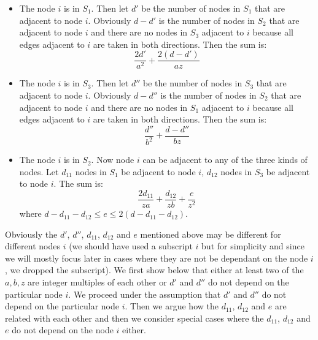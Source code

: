 \begin{itemize}
\item The node $i$ is in $S_1$. Then let $d'$ be the number of nodes in $S_1$ that are adjacent to node $i$. Obviously $d-d'$ is the number of nodes in $S_2$ that are adjacent to node $i$ and there are no nodes in $S_3$ adjacent to $i$ because all edges adjacent to $i$ are taken in both directions. Then the sum is: $$\frac{2d'}{a^2}+\frac{2 (d-d')}{az}$$

\item The node $i$ is in $S_3$. Then let $d''$ be the number of nodes in $S_3$ that are adjacent to node $i$. Obviously $d-d''$ is the number of nodes in $S_2$ that are adjacent to node $i$ and there are no nodes in $S_1$ adjacent to $i$ because all edges adjacent to $i$ are taken in both directions. Then the sum is: $$\frac{d''}{b^2}+ \frac{d-d''}{bz} $$


\item The node $i$ is in $S_2$. Now node $i$ can be adjacent to any of the three kinds of nodes. Let  $d_{11}$ nodes in $S_1$ be adjacent to node $i$, $d_{12}$ nodes in $S_3$ be adjacent to node $i$. The sum is:
    $$\frac{2d_{11}}{za}+ \frac{d_{12}}{zb}+ \frac{e}{z^2}$$
    where $d-d_{11}-d_{12}\leq e \leq 2(d-d_{11}-d_{12})$.
\end{itemize}

Obviously the $d'$, $d''$, $d_{11}$, $d_{12}$ and $e$ mentioned above may be
different for different nodes $i$ (we should have used a subscript $i$ but
for simplicity and since we will mostly focus later in cases
where they are not be dependant on the node
$i$, we dropped the subscript). We first show below that either at least two of
the $a,b,z$ are integer
multiples of each other or $d'$ and $d''$ do not
depend on the particular node $i$.
We proceed under the assumption that  $d'$ and $d''$ do not
depend on the particular node $i$.
Then we argue how the $d_{11}$, $d_{12}$ and $e$
are related with each other and then we consider special cases where
the $d_{11}$, $d_{12}$ and $e$ do not depend on the node $i$ either.

